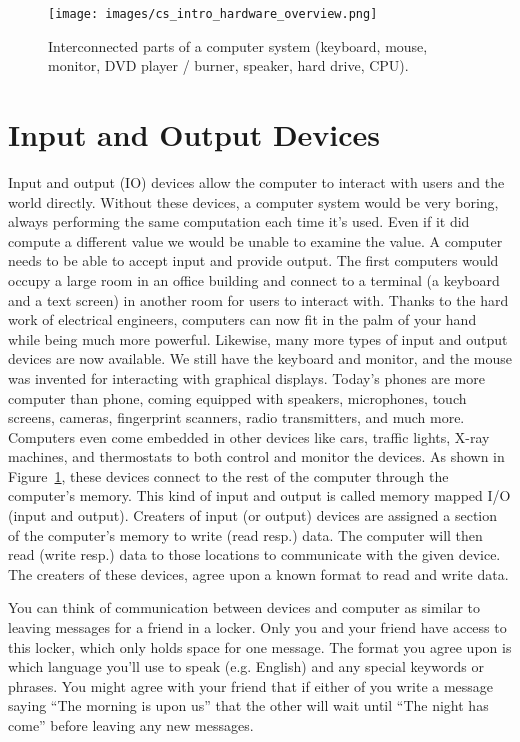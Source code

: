 \begin{figure}
	\centering
	\texttt{[image: images/cs\_intro\_hardware\_overview.png]}
	\caption{Interconnected parts of a computer system (keyboard, mouse,
                 monitor, DVD player / burner, speaker, hard drive, CPU).
                 }
	\label{fig:hardware:overview}
\end{figure}

\section{Input and Output Devices}

Input and output (IO) devices allow the computer to interact with users and the world
directly. Without these devices, a computer system would be very boring, always
performing the same computation each time it's used. Even if it did compute a
different value we would be unable to examine the value. A computer needs to be
able to accept input and provide output. The first computers would occupy a
large room in an office building and connect to a terminal (a keyboard and a
text screen) in another room for users to interact with. Thanks to the hard work
of electrical engineers,
computers can now fit in the palm of your hand while being much more powerful.
Likewise, many more types of input and output devices are now available. We
still have the keyboard and monitor, and the mouse was invented for interacting
with graphical displays. Today's phones are more computer than phone, coming
equipped with speakers, microphones, touch screens, cameras, fingerprint
scanners, radio transmitters, and much more. Computers even come embedded in
other devices like cars, traffic lights, X-ray machines, and thermostats to both
control and monitor the devices. As shown in Figure~\ref{fig:hardware:overview},
these devices connect to the rest of the computer through the computer's memory.
This kind of input and output is called memory mapped I/O (input and output).
Creaters of input (or output) devices are assigned a section of the computer's
memory to write (read resp.) data. The computer will then read (write resp.)
data to those locations to communicate with the given device. The creaters of
these devices, agree upon a known format to read and write data.

\begin{example}
  You can think of communication between devices and computer as similar to
  leaving messages for a friend in a locker. Only you and your friend have
  access to this locker, which only holds space for one message. The format you
  agree upon is which language you'll use to speak (e.g. English) and any
  special keywords or phrases. You might agree with your friend that if either
  of you write a message saying ``The morning is upon us'' that the other will
  wait until ``The night has come'' before leaving any new messages.
\end {example}

